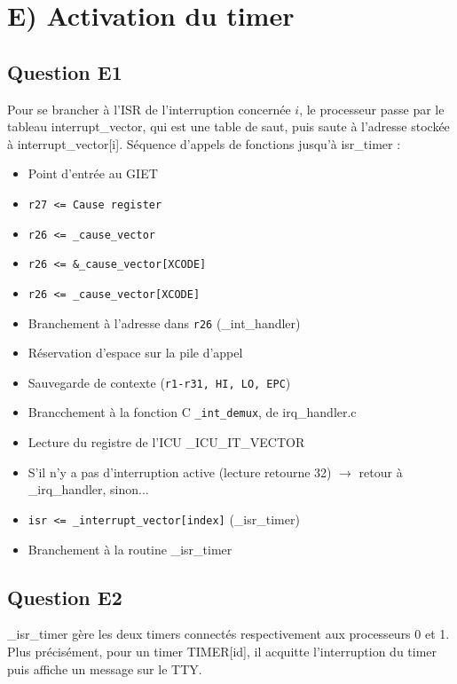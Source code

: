 \documentclass[10pt]{article}
\begin{document}
\section{E) Activation du timer}

\subsection{Question E1}
Pour se brancher à l'ISR de l'interruption concernée $i$, le processeur passe
par le tableau interrupt\_vector, qui est une table de saut, puis saute à
l'adresse stockée à interrupt\_vector[i].
\newline
Séquence d'appels de fonctions jusqu'à isr\_timer :
\begin{itemize}
  \item Point d'entrée au GIET
  \item \texttt{r27 <= Cause register}
  \item \texttt{r26 <= \_cause\_vector}
  \item \texttt{r26 <= \&\_cause\_vector[XCODE]}
  \item \texttt{r26 <= \_cause\_vector[XCODE]}
  \item Branchement à l'adresse dans \texttt{r26} (\_int\_handler)
  \item Réservation d'espace sur la pile d'appel
  \item Sauvegarde de contexte (\texttt{r1-r31, HI, LO, EPC})
  \item Brancchement à la fonction C \texttt{\_int\_demux}, de irq\_handler.c
  \item Lecture du registre de l'ICU \_ICU\_IT\_VECTOR
  \item S'il n'y a pas d'interruption active (lecture retourne 32)
  $\rightarrow$ retour à \_irq\_handler, sinon...
  \item \texttt{isr <= \_interrupt\_vector[index]} (\_isr\_timer)
  \item Branchement à la routine \_isr\_timer
\end{itemize}

\subsection{Question E2}
\_isr\_timer gère les deux timers connectés respectivement aux processeurs 0 et
1. Plus précisément, pour un timer TIMER[id], il acquitte l'interruption du
timer puis affiche un message sur le TTY.
\end{document}
